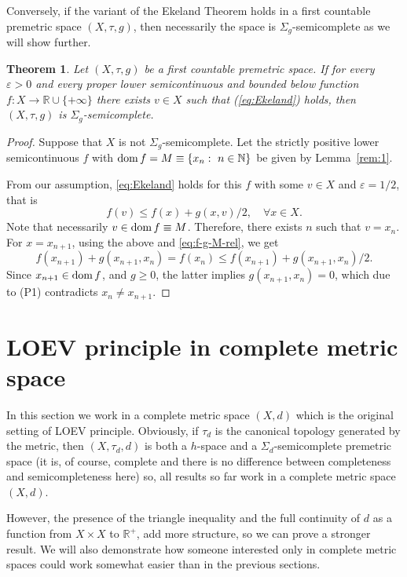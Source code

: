 \documentclass[12pt]{article}
\newtheorem{theorem}{Theorem}[section]
\def\dom{\mathop{\rm dom}}
\newcommand{\R}{\mathbb{R}}
\begin{document}
Conversely,  if the variant of the Ekeland Theorem  holds  in a first countable premetric space $(X,\tau,g)$, then necessarily the space is $\Sigma_g$-semicomplete as we will show further.


\begin{theorem} \label{Ekeland invers}
Let $(X,\tau,g)$ be a first countable premetric space. If for every $\varepsilon>0$ and every proper lower semicontinuous and bounded below function $f: X \rightarrow \R \cup \{+\infty\}$ there exists $v \in X$ such that (\ref{eq:Ekeland}) holds, then $(X,\tau,g)$ is  $\Sigma_g$-semicomplete.
\end{theorem}

\begin{proof}
Suppose that $X$ is not $\Sigma_g$-semicomplete. Let the strictly positive lower semicontinuous $f$ with $\dom f = M\equiv \{x_n:\ n\in\mathbb{N}\}$ be given by Lemma~\ref{rem:1}.

From our assumption, \eqref{eq:Ekeland} holds for this $f$ with some $v\in X$ and $\varepsilon = 1/2$, that is
\[f (v) \leq f(x)+ g(x,v)/2,\quad\forall x\in X.\]
Note that necessarily $v \in \dom f \equiv M$. Therefore, there exists $n$ such that $v=x_{n}$. For  $x=x_{n+1}$, using the above and \eqref{eq:f-g-M-rel}, we get
$$
  f(x_{n+1}) + g(x_{n+1},x_{n}) = f(x_{n}) \leq f(x_{n+1})+ g(x_{n+1},x_{n})/2.
$$
Since $x_{n+1}\in \dom f$, and $g\ge0$, the latter implies $g(x_{n+1},x_{n})=0$, which due to (P1) contradicts $x_n\neq x_{n+1}$.\end{proof}

\section{LOEV principle in complete metric space}\label{sec:cmp}

    In this section we work in a complete metric space $(X,d)$ which is the original setting of LOEV principle. Obviously, if $\tau_d$ is the canonical topology generated by the metric, then $(X,\tau_d,d)$ is both a $h$-space and a $\Sigma_d$-semicomplete premetric space (it is, of course, complete and there is no difference between completeness and semicompleteness here) so, all results so far work in a complete metric space $(X,d)$.

    However, the presence of the triangle inequality and the full continuity of $d$ as a function from $X\times X$ to $\mathbb{R}^+$, add more structure, so we can prove a stronger result. We will also demonstrate how someone interested only in complete metric spaces could work somewhat easier than in the previous sections.
\end{document}
